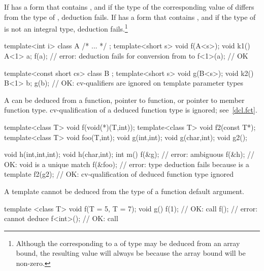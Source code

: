 \pnum
If  has a form that contains , and if the type of the
corresponding value of  differs from the type of , deduction
fails. If  has a form that contains \tcode{[i]}, and if the type of
 is not an integral type, deduction fails.\footnote{Although the
corresponding to a
of type
may be deduced from an array bound, the resulting value will always be
because the array bound will be non-zero.}
\enterexample

\begin{codeblock}
template<int i> class A { /* ... */ };
template<short s> void f(A<s>);
void k1() {
  A<1> a;
  f(a);             // error: deduction fails for conversion from  to 
  f<1>(a);          // OK
}

template<const short cs> class B { };
template<short s> void g(B<s>);
void k2() {
  B<1> b;
  g(b);             // OK: cv-qualifiers are ignored on template parameter types
}
\end{codeblock}
\exitexample

\pnum
A
can be deduced from a function, pointer to function, or pointer to
member function type.
\enternote
cv-qualification of a deduced function type is ignored; see~\ref{dcl.fct}.
\exitnote

\enterexample

\begin{codeblock}
template<class T> void f(void(*)(T,int));
template<class T> void f2(const T*);
template<class T> void foo(T,int);
void g(int,int);
void g(char,int);
void g2();

void h(int,int,int);
void h(char,int);
int m() {
  f(&g);            // error: ambiguous
  f(&h);            // OK: void  is a unique match
  f(&foo);          // error: type deduction fails because  is a template
  f2(g2);           // OK: cv-qualification of deduced function type ignored
}
\end{codeblock}
\exitexample

\pnum
A template
cannot be deduced from the type of a function default argument.
\enterexample

\begin{codeblock}
template <class T> void f(T = 5, T = 7);
void g() {
  f(1);             // OK: call 
  f();              // error: cannot deduce 
  f<int>();         // OK: call 
}
\end{codeblock}
\exitexample

